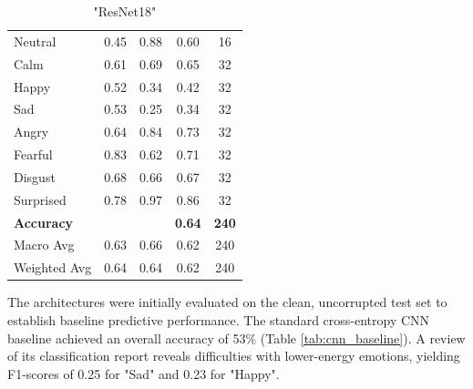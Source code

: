 \documentclass[12pt,hitec]{report}
\begin{document}
\begin{table}[H]
\begin{minipage}{0.48\textwidth}
{\begin{tabular}{lcccc}
        Neutral          & 0.45               & 0.88            & 0.60              & 16                \\
        Calm             & 0.61               & 0.69            & 0.65              & 32               \\
        Happy            & 0.52               & 0.34            & 0.42              & 32               \\
        Sad              & 0.53               & 0.25            & 0.34              & 32               \\
        Angry            & 0.64               & 0.84            & 0.73              & 32               \\
        Fearful          & 0.83               & 0.62            & 0.71              & 32               \\
        Disgust          & 0.68               & 0.66            & 0.67              & 32               \\
        Surprised        & 0.78               & 0.97            & 0.86              & 32               \\ \hline
        \textbf{Accuracy}&                    &                 & \textbf{0.64}     & \textbf{240}     \\
        Macro Avg        & 0.63               & 0.66            & 0.62              & 240              \\
        Weighted Avg     & 0.64               & 0.64            & 0.62              & 240             \\ \hline
        \end{tabular}
        }
        \caption{"ResNet18"}
        \label{tab:resnet18}
    \end{minipage}
\end{table}

The architectures were initially evaluated on the clean, uncorrupted test set to establish baseline predictive performance. The standard cross-entropy CNN baseline achieved an overall accuracy of 53\% (Table \ref{tab:cnn_baseline}). A review of its classification report reveals difficulties with lower-energy emotions, yielding F1-scores of 0.25 for "Sad" and 0.23 for "Happy".
    
\end{document}
